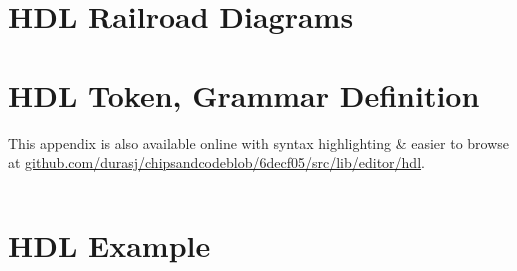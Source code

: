 \appendix

\chapter{HDL Railroad Diagrams}
\label{appendix:hdl-railroad}

\noindent


\vspace{20pt}

\noindent


\noindent


\vspace{20pt}

\noindent


\vspace{20pt}

\noindent


\vspace{20pt}

\noindent


\noindent


\vspace{20pt}

\noindent


\vspace{20pt}

\noindent


\vspace{20pt}

\noindent


\chapter{HDL Token, Grammar Definition}
\label{appendix:hdl-grammar}

This appendix is also available online with syntax highlighting \& easier to browse at \href{https://github.com/durasj/chipsandcode/blob/6decf05115ba1d4ca927de42f63c8431b1ac3124/src/lib/editor/hdl/grammar.ne}{github.com/durasj/chipsandcodeblob/6decf05/src/lib/editor/hdl}.

\inputminted[breaklines=true,fontsize=\footnotesize]{text}{./assets/hdl.ne}

\chapter{HDL Example}
\label{appendix:hdl-example}

